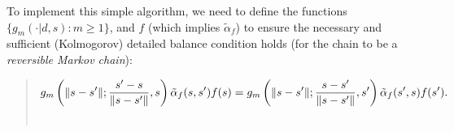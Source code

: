 \documentclass[a4paper,10pt,english]{sphinxmanual}
\begin{document}
\begin{center}\setlength{\fboxsep}{5pt}\end{center}

To implement this simple algorithm, we need to define the functions $\{ g_m(\cdot | d,s) : m \geq 1 \}$, and $f$ (which implies $\tilde{\alpha}_f$) to ensure the necessary and sufficient (Kolmogorov) detailed balance condition holds (for the chain to be a \emph{reversible Markov chain}):
\begin{quote}
\begin{gather}
\begin{split}g_m \left( \| s - s' \| ; \frac{s' - s}{\| s - s' \|}, s
\right) \tilde{\alpha}_f(s,s')f(s) =
g_m \left( \| s - s' \| ; \frac{s - s'}{\| s - s' \|}, s'
\right) \tilde{\alpha}_f(s',s)f(s').\end{split}\notag\\\begin{split}\end{split}\notag
\end{gather}\end{quote}
\end{document}
